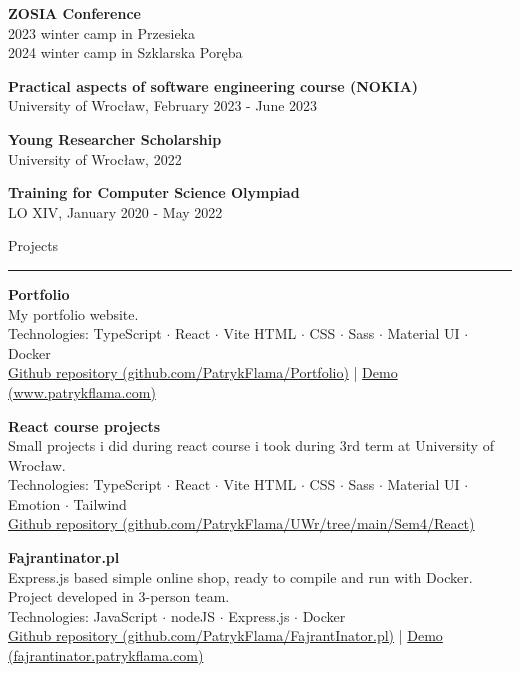 \documentclass{letter}
\begin{document}
\begin{minipage}[t]{0.70\textwidth}
\begin{tcolorbox}[colback=white, colframe=white, width=\textwidth, boxrule=0pt, sharp corners, height=\textheight, left=5mm, right=5mm, top=5mm, bottom=5mm]
{}

{ 
\vspace{1mm}
\textbf{ZOSIA Conference} \\
{\small 2023 winter camp in Przesieka} \\
{\small 2024 winter camp in Szklarska Poręba}

\vspace{1mm}
\textbf{Practical aspects of software engineering course (NOKIA)} \\
{\small University of Wrocław, February 2023 - June 2023}

\vspace{1mm}
\textbf{Young Researcher Scholarship} \\
{\small University of Wrocław, 2022}

\vspace{1mm}
\textbf{Training for Computer Science Olympiad} \\
{\small LO XIV, January 2020 - May 2022}

}


{\large Projects}
\rule{\linewidth}{0.4pt}

{ 

\textbf{Portfolio}  \\
My portfolio website. \\
{\small Technologies: TypeScript $\cdot$ React $\cdot$ Vite 
HTML $\cdot$ CSS $\cdot$ Sass $\cdot$ Material UI $\cdot$ Docker } \\
{\small \href{https://github.com/PatrykFlama/Portfolio}{Github repository (github.com/PatrykFlama/Portfolio)}} 
| {\small \href{https://www.patrykflama.com/}{Demo (www.patrykflama.com)}}

\textbf{React course projects}  \\
Small projects i did during react course i took during 3rd term at University of Wrocław. \\
{\small Technologies: TypeScript $\cdot$ React $\cdot$ Vite 
HTML $\cdot$ CSS $\cdot$ Sass $\cdot$ Material UI $\cdot$ Emotion $\cdot$ Tailwind } \\
{\small \href{https://github.com/PatrykFlama/UWr/tree/main/Sem4/React}{Github repository (github.com/PatrykFlama/UWr/tree/main/Sem4/React)}}

\textbf{Fajrantinator.pl}  \\
Express.js based simple online shop, ready to compile and run with Docker. Project developed in 3-person team. \\
{\small Technologies: JavaScript $\cdot$ nodeJS $\cdot$ Express.js $\cdot$ Docker } \\
{\small \href{https://github.com/PatrykFlama/FajrantInator.pl}{Github repository (github.com/PatrykFlama/FajrantInator.pl)}} 
| {\small \href{https://fajrantinator.patrykflama.com/}{Demo (fajrantinator.patrykflama.com)}}

}
\end{tcolorbox}
\end{minipage}
\end{document}

